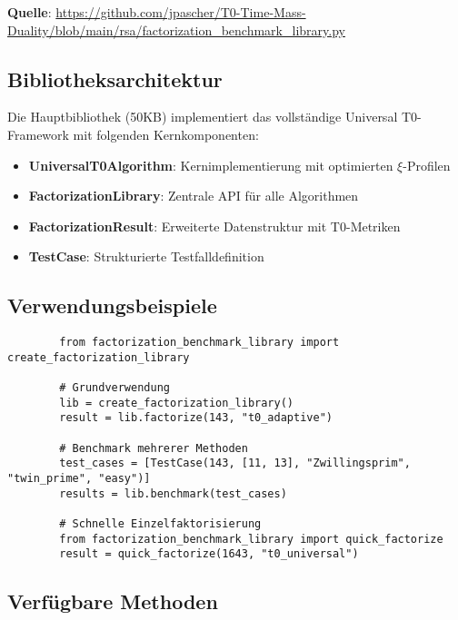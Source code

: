 \documentclass[12pt,a4paper]{article}
\begin{document}
	\textbf{Quelle}: \url{https://github.com/jpascher/T0-Time-Mass-Duality/blob/main/rsa/factorization_benchmark_library.py}
	
	\subsection{Bibliotheksarchitektur}
	
	Die Hauptbibliothek (50KB) implementiert das vollständige Universal T0-Framework mit folgenden Kernkomponenten:
	
	\begin{itemize}
		\item \textbf{UniversalT0Algorithm}: Kernimplementierung mit optimierten $\xi$-Profilen
		\item \textbf{FactorizationLibrary}: Zentrale API für alle Algorithmen
		\item \textbf{FactorizationResult}: Erweiterte Datenstruktur mit T0-Metriken
		\item \textbf{TestCase}: Strukturierte Testfalldefinition
	\end{itemize}
	
	\subsection{Verwendungsbeispiele}
	
	\begin{verbatim}
		from factorization_benchmark_library import create_factorization_library
		
		# Grundverwendung
		lib = create_factorization_library()
		result = lib.factorize(143, "t0_adaptive")
		
		# Benchmark mehrerer Methoden
		test_cases = [TestCase(143, [11, 13], "Zwillingsprim", "twin_prime", "easy")]
		results = lib.benchmark(test_cases)
		
		# Schnelle Einzelfaktorisierung
		from factorization_benchmark_library import quick_factorize
		result = quick_factorize(1643, "t0_universal")
	\end{verbatim}
	
	\subsection{Verfügbare Methoden}
	
\end{document}
